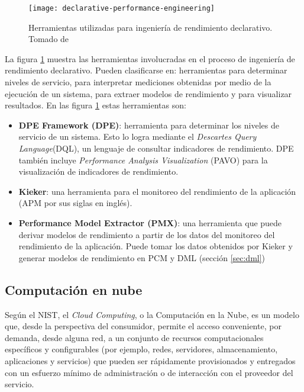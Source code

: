 \begin{figure}[h]
  \centering
  \texttt{[image: declarative-performance-engineering]}
  \caption[Herramientas utilizadas para ingeniería de rendimiento declarativo]{Herramientas utilizadas para ingeniería de rendimiento declarativo. Tomado de \cite{Walter:2018:TDP:3185768.3185777}}
  \label{fig:declarative-performance-engineering}
\end{figure}


La figura \ref{fig:declarative-performance-engineering} muestra las herramientas involucradas en el proceso de ingeniería de rendimiento declarativo. Pueden clasificarse en: herramientas para determinar niveles de servicio, para interpretar mediciones obtenidas por medio de la ejecución de un sistema, para extraer modelos de rendimiento y para visualizar resultados. En las figura \ref{fig:declarative-performance-engineering} estas herramientas son:
\begin{itemize}
    \item \textbf{DPE Framework (DPE)}: herramienta para determinar los niveles de servicio de un sistema. Esto lo logra mediante el \emph{Descartes Query Language}(DQL), un lenguaje de consultar indicadores de rendimiento. DPE también incluye \emph{Performance Analysis Visualization} (PAVO) para la visualización de indicadores de rendimiento.
    \item \textbf{Kieker}: una herramienta para el monitoreo del rendimiento de la aplicación (APM por sus siglas en inglés). 
    \item \textbf{Performance Model Extractor (PMX)}: una herramienta que puede derivar modelos de rendimiento a partir de los datos del monitoreo del rendimiento de la aplicación. Puede tomar los datos obtenidos por Kieker y generar modelos de rendimiento en PCM y DML (sección \ref{sec:dml})
\end{itemize}

 
\subsection{Computación en nube}

Según el NIST\cite{Mell:2011:SND:2206223}, el \emph{Cloud Computing}, o la Computación en la Nube, es un modelo que, desde la perspectiva del consumidor, permite el acceso conveniente, por demanda, desde alguna red, a un conjunto de recursos computacionales específicos y configurables (por ejemplo, redes, servidores, almacenamiento, aplicaciones y servicios) que pueden ser rápidamente provisionados y entregados con un esfuerzo mínimo de administración o de interacción con el proveedor del servicio.

